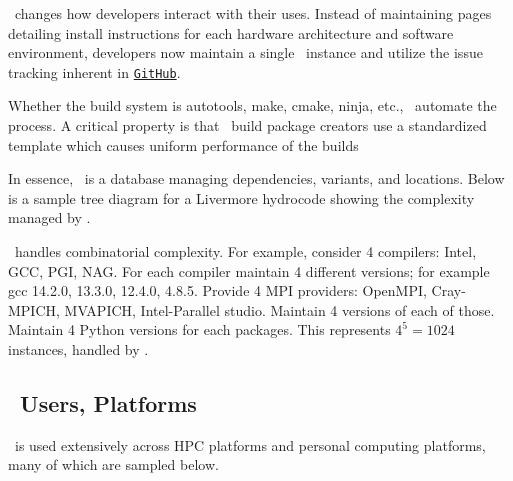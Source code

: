 \documentclass[10pt, oneside]{article}   	%
\begin{document}
\spack \ changes how developers interact with their uses. Instead of maintaining pages detailing install instructions for each hardware architecture and software environment, developers now maintain a single \spack \ instance and utilize the issue tracking inherent in \href{https://github.com/spack/spack}{\texttt{GitHub}}.

Whether the build system is autotools, make, cmake, ninja, etc., \spack \ automate the process. A critical property is that \spack \ build package creators use a standardized template which causes uniform performance of the builds

In essence, \spack \ is a database managing dependencies, variants, and locations. Below is a sample tree diagram for a Livermore hydrocode showing the complexity managed by \spack.

\spack \ handles combinatorial complexity. For example, consider 4 compilers: Intel, GCC, PGI, NAG. For each compiler maintain 4 different versions; for example gcc 14.2.0, 13.3.0, 12.4.0, 4.8.5. Provide 4 MPI providers: OpenMPI, Cray-MPICH, MVAPICH, Intel-Parallel studio. Maintain 4 versions of each of those. Maintain 4 Python versions for each packages. This represents $4^{5} = 1024$ instances, handled by \spack. 

\subsection{\spack \ Users, Platforms}
\spack \ is used extensively across HPC platforms and personal computing platforms, many of which are sampled below.
\end{document}

